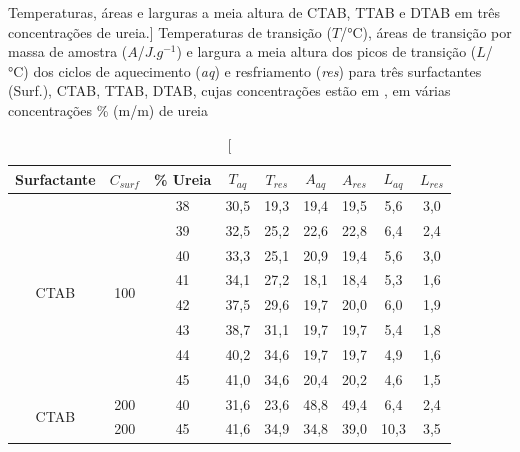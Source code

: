     \begin{table}[h]
        \IBGEtab%
        {\caption%
        	[Temperaturas, áreas e larguras a meia altura de CTAB, TTAB e DTAB em três concentrações de ureia.]%
        	{Temperaturas de transição ($T$/°C), áreas de transição por massa de amostra ($A$/$J.g^{-1}$) e largura a meia altura dos picos de transição ($L$/°C) dos ciclos de aquecimento (\emph{aq}) e resfriamento (\emph{res}) para três surfactantes (Surf.), CTAB, TTAB, DTAB, cujas concentrações estão em \mM, em várias concentrações \% (m/m) de ureia}
        \label{tab:DSC_temp_areas}}%
        {\begin{tabular}{ccccccccc}
        	\toprule
        	        Surfactante         &      $C_{surf}$      & \% Ureia & $T_{aq}$ & $T_{res}$ & $A_{aq}$ & $A_{res}$ & $L_{aq}$ & $L_{res}$ \\ \midrule
        	\multirow{8}{*}{CTAB} & \multirow{8}{*}{100} &   38   &   30,5   &   19,3    &   19,4   &   19,5    &   5,6    &    3,0    \\
        	                      &                      &   39   &   32,5   &   25,2    &   22,6   &   22,8    &   6,4    &    2,4    \\
        	                      &                      &   40   &   33,3   &   25,1    &   20,9   &   19,4    &   5,6    &    3,0    \\
        	                      &                      &   41   &   34,1   &   27,2    &   18,1   &   18,4    &   5,3    &    1,6    \\
        	                      &                      &   42   &   37,5   &   29,6    &   19,7   &   20,0    &   6,0    &    1,9    \\
        	                      &                      &   43   &   38,7   &   31,1    &   19,7   &   19,7    &   5,4    &    1,8    \\
        	                      &                      &   44   &   40,2   &   34,6    &   19,7   &   19,7    &   4,9    &    1,6    \\
        	                      &                      &   45   &   41,0   &   34,6    &   20,4   &   20,2    &   4,6    &    1,5    \\ \midrule
        	\multirow{2}{*}{CTAB} &         200          &   40   &   31,6   &   23,6    &   48,8   &   49,4    &   6,4    &    2,4    \\
        	                      &         200          &   45   &   41,6   &   34,9    &   34,8   &   39,0    &   10,3   &    3,5    \\ \midrule

\end{tabular}}
\end{table}
